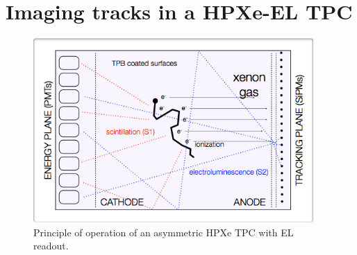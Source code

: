 \documentclass[a4paper,11pt]{article}
\begin{document}

\section{Imaging tracks in a HPXe-EL TPC}
\label{sec.topology}

\begin{figure}[!htb]
\centering
\includegraphics[width= 0.95\textwidth]{fig/nextEL.png}
\caption{Principle of operation of an asymmetric HPXe TPC with EL readout.} \label{fig.SS}
\end{figure}
\end{document}
